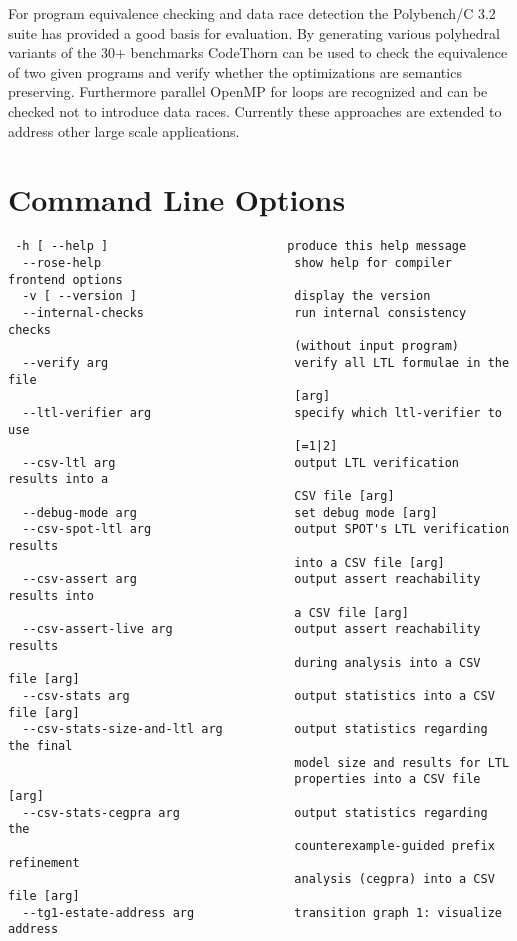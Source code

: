 \documentclass[natbib]{article}
\begin{document}
For program equivalence checking and data race detection the
Polybench/C 3.2 suite has provided a good basis for evaluation. By
generating various polyhedral variants of the 30+ benchmarks CodeThorn
can be used to check the equivalence of two given programs and verify
whether the optimizations are semantics preserving. Furthermore
parallel OpenMP for loops are recognized and can be checked not to
introduce data races. Currently these approaches are extended to
address other large scale applications.

\section{Command Line Options}
\begin{verbatim}
 -h [ --help ]                         produce this help message
  --rose-help                           show help for compiler frontend options
  -v [ --version ]                      display the version
  --internal-checks                     run internal consistency checks 
                                        (without input program)
  --verify arg                          verify all LTL formulae in the file 
                                        [arg]
  --ltl-verifier arg                    specify which ltl-verifier to use 
                                        [=1|2]
  --csv-ltl arg                         output LTL verification results into a 
                                        CSV file [arg]
  --debug-mode arg                      set debug mode [arg]
  --csv-spot-ltl arg                    output SPOT's LTL verification results 
                                        into a CSV file [arg]
  --csv-assert arg                      output assert reachability results into
                                        a CSV file [arg]
  --csv-assert-live arg                 output assert reachability results 
                                        during analysis into a CSV file [arg]
  --csv-stats arg                       output statistics into a CSV file [arg]
  --csv-stats-size-and-ltl arg          output statistics regarding the final 
                                        model size and results for LTL 
                                        properties into a CSV file [arg]
  --csv-stats-cegpra arg                output statistics regarding the 
                                        counterexample-guided prefix refinement
                                        analysis (cegpra) into a CSV file [arg]
  --tg1-estate-address arg              transition graph 1: visualize address 

\end{verbatim}
\end{document}
